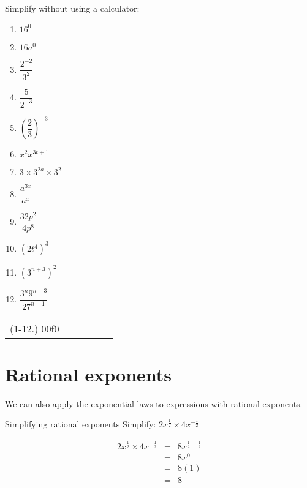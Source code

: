 \begin{exercises}{}{Simplify without using a calculator:
\begin{multicols}{2}
\begin{enumerate}[label=\textbf{\arabic*}., itemsep=5pt]
 \item $16^0$
 \item $16a^0$
 \item $\dfrac{2^{-2}}{3^2}$
 \item $ \dfrac{5}{2^{-3}}$
 \item $ \left(\dfrac{2}{3}\right)^{-3} $
 \item $ x^2 x^{3t+1} $
 \item $ 3 \times 3^{2a} \times 3^2$
 \item $ \dfrac{a^{3x}}{a^x} $
 \item $ \dfrac{32p^2}{4p^8}$
 \item $ (2t^4)^3$
 \item $ (3^{n+3})^2$
 \item $ \dfrac{3^n 9^{n-3}}{27^{n-1}}$
\end{enumerate}
\end{multicols}
\practiceinfo
\par
\begin{tabular}[h]{cccccc}
(1-12.) 00f0\end{tabular}
}
\end{exercises}

\section{Rational exponents}

We can also apply the exponential laws to expressions with rational exponents.
\par
{}

\begin{wex}
{Simplifying rational exponents}
{Simplify: $2x^{\frac{1}{2}}\times 4x^{-\frac{1}{2}}$}
{

\begin{eqnarray*}
 2x^{\frac{1}{2}} \times 4x^{-\frac{1}{2}} & = & 8x^{\frac{1}{2}-\frac{1}{2}} \\
					  & = & 8x^0 \\
					  & = & 8(1) \\
					  & = & 8 
\end{eqnarray*}
}
\end{wex}


